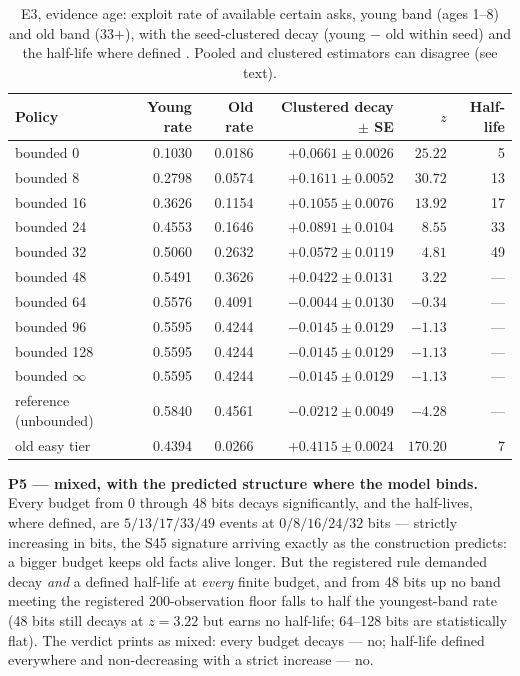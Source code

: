 \documentclass[11pt]{article}
\begin{document}
\begin{table}[t]
\centering
\caption{E3, evidence age: exploit rate of available certain asks, young band (ages
1--8) and old band (33$+$), with the seed-clustered decay (young $-$ old within seed)
and the half-life where defined \cite{artifact}. Pooled and clustered estimators can
disagree (see text).}
\label{tab:decay}
\footnotesize
\begin{tabular}{@{}lrrrrr@{}}
\toprule
Policy & Young rate & Old rate & Clustered decay $\pm$ SE & $z$ & Half-life \\
\midrule
bounded 0    & 0.1030 & 0.0186 & $+0.0661 \pm 0.0026$ & $25.22$ & 5 \\
bounded 8    & 0.2798 & 0.0574 & $+0.1611 \pm 0.0052$ & $30.72$ & 13 \\
bounded 16   & 0.3626 & 0.1154 & $+0.1055 \pm 0.0076$ & $13.92$ & 17 \\
bounded 24   & 0.4553 & 0.1646 & $+0.0891 \pm 0.0104$ & $8.55$  & 33 \\
bounded 32   & 0.5060 & 0.2632 & $+0.0572 \pm 0.0119$ & $4.81$  & 49 \\
bounded 48   & 0.5491 & 0.3626 & $+0.0422 \pm 0.0131$ & $3.22$  & --- \\
bounded 64   & 0.5576 & 0.4091 & $-0.0044 \pm 0.0130$ & $-0.34$ & --- \\
bounded 96   & 0.5595 & 0.4244 & $-0.0145 \pm 0.0129$ & $-1.13$ & --- \\
bounded 128  & 0.5595 & 0.4244 & $-0.0145 \pm 0.0129$ & $-1.13$ & --- \\
bounded $\infty$ & 0.5595 & 0.4244 & $-0.0145 \pm 0.0129$ & $-1.13$ & --- \\
\midrule
reference (unbounded) & 0.5840 & 0.4561 & $-0.0212 \pm 0.0049$ & $-4.28$ & --- \\
old easy tier & 0.4394 & 0.0266 & $+0.4115 \pm 0.0024$ & $170.20$ & 7 \\
\bottomrule
\end{tabular}
\end{table}

\textbf{P5 --- mixed, with the predicted structure where the model binds.} Every budget
from 0 through 48 bits decays significantly, and the half-lives, where defined, are
$5/13/17/33/49$ events at $0/8/16/24/32$ bits --- strictly increasing in bits, the S45
signature arriving exactly as the construction predicts: a bigger budget keeps old
facts alive longer. But the registered rule demanded decay \emph{and} a defined
half-life at \emph{every} finite budget, and from 48 bits up no band meeting the
registered 200-observation floor falls to half the youngest-band rate (48 bits still
decays at $z = 3.22$ but earns no half-life; 64--128 bits are statistically flat).
The verdict prints as mixed: every
budget decays --- no; half-life defined everywhere and non-decreasing with a strict
increase --- no.
\end{document}
